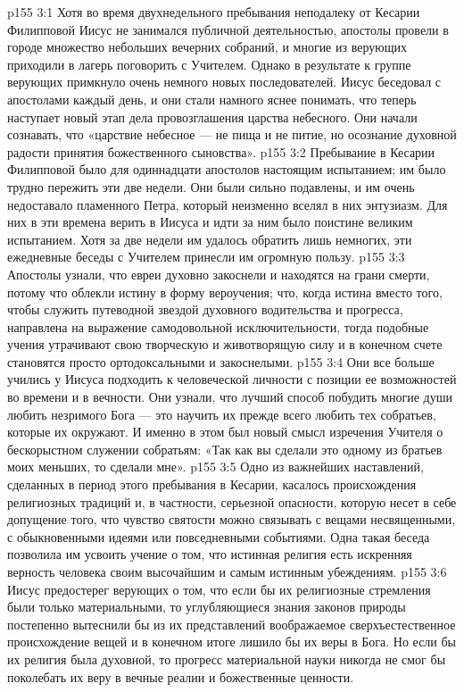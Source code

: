 \vs p155 3:1 Хотя во время двухнедельного пребывания неподалеку от Кесарии Филипповой Иисус не занимался публичной деятельностью, апостолы провели в городе множество небольших вечерних собраний, и многие из верующих приходили в лагерь поговорить с Учителем. Однако в результате к группе верующих примкнуло очень немного новых последователей. Иисус беседовал с апостолами каждый день, и они стали намного яснее понимать, что теперь наступает новый этап дела провозглашения царства небесного. Они начали сознавать, что «царствие небесное --- не пища и не питие, но осознание духовной радости принятия божественного сыновства».
\vs p155 3:2 Пребывание в Кесарии Филипповой было для одиннадцати апостолов настоящим испытанием; им было трудно пережить эти две недели. Они были сильно подавлены, и им очень недоставало пламенного Петра, который неизменно вселял в них энтузиазм. Для них в эти времена верить в Иисуса и идти за ним было поистине великим испытанием. Хотя за две недели им удалось обратить лишь немногих, эти ежедневные беседы с Учителем принесли им огромную пользу.
\vs p155 3:3 Апостолы узнали, что евреи духовно закоснели и находятся на грани смерти, потому что облекли истину в форму вероучения; что, когда истина вместо того, чтобы служить путеводной звездой духовного водительства и прогресса, направлена на выражение самодовольной исключительности, тогда подобные учения утрачивают свою творческую и животворящую силу и в конечном счете становятся просто ортодоксальными и закоснелыми.
\vs p155 3:4 Они все больше учились у Иисуса подходить к человеческой личности с позиции ее возможностей во времени и в вечности. Они узнали, что лучший способ побудить многие души любить незримого Бога --- это научить их прежде всего любить тех собратьев, которые их окружают. И именно в этом был новый смысл изречения Учителя о бескорыстном служении собратьям: «Так как вы сделали это одному из братьев моих меньших, то сделали мне».
\vs p155 3:5 Одно из важнейших наставлений, сделанных в период этого пребывания в Кесарии, касалось происхождения религиозных традиций и, в частности, серьезной опасности, которую несет в себе допущение того, что чувство святости можно связывать с вещами несвященными, с обыкновенными идеями или повседневными событиями. Одна такая беседа позволила им усвоить учение о том, что истинная религия есть искренняя верность человека своим высочайшим и самым истинным убеждениям.
\vs p155 3:6 Иисус предостерег верующих о том, что если бы их религиозные стремления были только материальными, то углубляющиеся знания законов природы постепенно вытеснили бы из их представлений воображаемое сверхъестественное происхождение вещей и в конечном итоге лишило бы их веры в Бога. Но если бы их религия была духовной, то прогресс материальной науки никогда не смог бы поколебать их веру в вечные реалии и божественные ценности.
